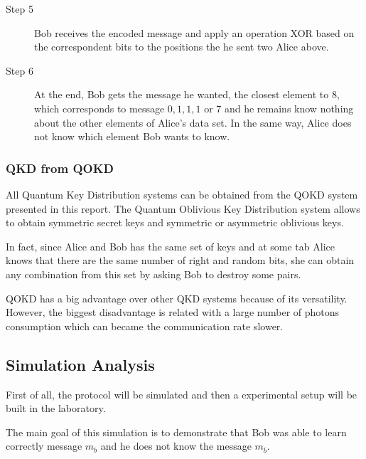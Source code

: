 \begin{description}
  \item[Step 5] Bob receives the encoded message and apply an operation XOR based on the correspondent bits to the positions the he sent two Alice above.

  \item[Step 6] At the end, Bob gets the message he wanted, the closest element to $8$, which corresponds to message ${0,1,1,1}$ or $7$ and he remains know nothing about the other elements of Alice's data set. In the same way, Alice does not know which element Bob wants to know.
\end{description}


\subsubsection{QKD from QOKD}

All Quantum Key Distribution systems can be obtained from the QOKD system presented in this report. The Quantum Oblivious Key Distribution system allows to obtain symmetric secret keys and symmetric or asymmetric oblivious keys.

In fact, since Alice and Bob has the same set of keys and at some tab Alice knows that there are the same number of right and random bits, she can obtain any combination from this set by asking Bob to destroy some pairs.

QOKD has a big advantage over other QKD systems because of its versatility. However, the biggest disadvantage is related with a large number of photons consumption which can became the communication rate slower.


\subsection{Simulation Analysis}

First of all, the protocol will be simulated and then a experimental setup will be built in the laboratory.

The main goal of this simulation is to demonstrate that Bob was able to learn correctly message $m_{b}$ and he does not know the message $m_{\overline{b}}$.

